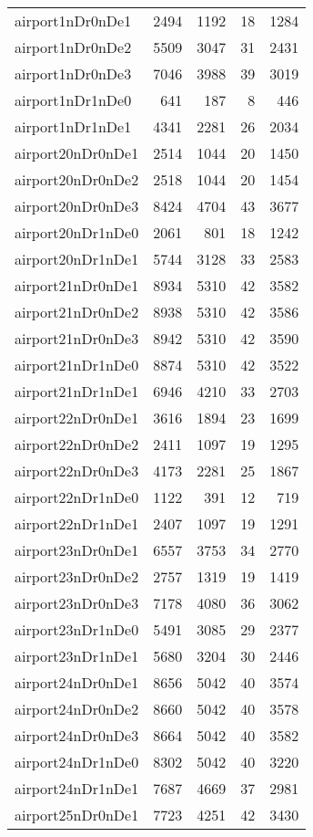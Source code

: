 \begin{longtable}{lrrrr}
airport1nDr0nDe1 & 2494 & 1192 & 18 & 1284 \\
airport1nDr0nDe2 & 5509 & 3047 & 31 & 2431 \\
airport1nDr0nDe3 & 7046 & 3988 & 39 & 3019 \\
airport1nDr1nDe0 & 641 & 187 & 8 & 446 \\
airport1nDr1nDe1 & 4341 & 2281 & 26 & 2034 \\
airport20nDr0nDe1 & 2514 & 1044 & 20 & 1450 \\
airport20nDr0nDe2 & 2518 & 1044 & 20 & 1454 \\
airport20nDr0nDe3 & 8424 & 4704 & 43 & 3677 \\
airport20nDr1nDe0 & 2061 & 801 & 18 & 1242 \\
airport20nDr1nDe1 & 5744 & 3128 & 33 & 2583 \\
airport21nDr0nDe1 & 8934 & 5310 & 42 & 3582 \\
airport21nDr0nDe2 & 8938 & 5310 & 42 & 3586 \\
airport21nDr0nDe3 & 8942 & 5310 & 42 & 3590 \\
airport21nDr1nDe0 & 8874 & 5310 & 42 & 3522 \\
airport21nDr1nDe1 & 6946 & 4210 & 33 & 2703 \\
airport22nDr0nDe1 & 3616 & 1894 & 23 & 1699 \\
airport22nDr0nDe2 & 2411 & 1097 & 19 & 1295 \\
airport22nDr0nDe3 & 4173 & 2281 & 25 & 1867 \\
airport22nDr1nDe0 & 1122 & 391 & 12 & 719 \\
airport22nDr1nDe1 & 2407 & 1097 & 19 & 1291 \\
airport23nDr0nDe1 & 6557 & 3753 & 34 & 2770 \\
airport23nDr0nDe2 & 2757 & 1319 & 19 & 1419 \\
airport23nDr0nDe3 & 7178 & 4080 & 36 & 3062 \\
airport23nDr1nDe0 & 5491 & 3085 & 29 & 2377 \\
airport23nDr1nDe1 & 5680 & 3204 & 30 & 2446 \\
airport24nDr0nDe1 & 8656 & 5042 & 40 & 3574 \\
airport24nDr0nDe2 & 8660 & 5042 & 40 & 3578 \\
airport24nDr0nDe3 & 8664 & 5042 & 40 & 3582 \\
airport24nDr1nDe0 & 8302 & 5042 & 40 & 3220 \\
airport24nDr1nDe1 & 7687 & 4669 & 37 & 2981 \\
airport25nDr0nDe1 & 7723 & 4251 & 42 & 3430 \\

\end{longtable}
